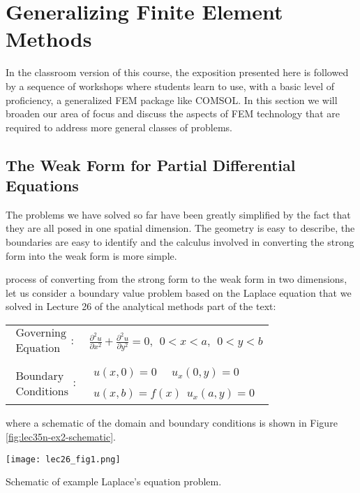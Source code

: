\section{Generalizing Finite Element Methods}
In the classroom version of this course, the exposition presented here is followed by a sequence of workshops where students learn to use, with a basic level of proficiency, a generalized FEM package like COMSOL.  In this section we will broaden our area of focus and discuss the aspects of FEM technology that are required to address more general classes of problems.

\subsection{The Weak Form for Partial Differential Equations}
The problems we have solved so far have been greatly simplified by the fact that they are all posed in one spatial dimension.  The geometry is easy to describe, the boundaries are easy to identify and the calculus involved in converting the strong form into the weak form is more simple. 

 process of converting from the strong form to the weak form in two dimensions, let us consider a boundary value problem based on the Laplace equation that we solved in Lecture 26 of the analytical methods part of the text:
\begin{table}[h]
\begin{tabular}{l l}
$\substack{\text{Governing} \\\text{Equation}}: $& $\frac{\partial^2 u}{\partial x^2} + \frac{\partial^2 u}{\partial y^2} = 0, \ \ 0<x<a, \ \ 0<y<b $\\
& \\
$\substack{\text{Boundary} \\ \text{Conditions}}: $ & $\substack{u(x,0)=0  \ \ \ \ \ \ u_x(0,y) = 0 \\ \\ u(x,b) = f(x) \ \ u_x(a,y) = 0}$ 
\end{tabular}
\end{table} 
where a schematic of the domain and boundary conditions is shown in Figure \ref{fig:lec35n-ex2-schematic}.
\begin{marginfigure}
\texttt{[image: lec26\_fig1.png]}
\caption{Schematic of example Laplace's equation problem.}
\label{fig:lec35n-ex2-schematic}
\end{marginfigure}  


